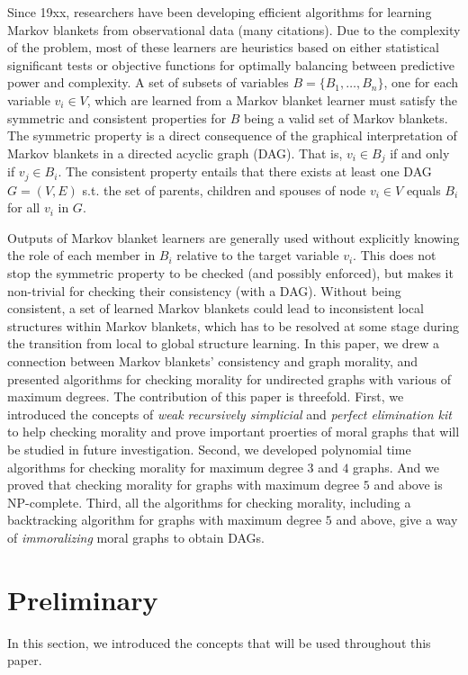 Since 19xx, researchers have been developing efficient algorithms for learning Markov blankets from observational data (many citations). Due to the complexity of the problem, most of these learners are heuristics based on either statistical significant tests or objective functions for optimally balancing between predictive power and complexity. A set of subsets of variables $B=\{B_1, \dots, B_n\}$, one for each variable $v_i \in V$, which are learned from a Markov blanket learner must satisfy the symmetric and consistent properties for $B$ being a valid set of Markov blankets. The symmetric property is a direct consequence of the graphical interpretation of Markov blankets in a directed acyclic graph (DAG). That is, $v_i \in B_j$ if and only if $v_j \in B_i$. The consistent property entails that there exists at least one DAG $G=(V,E)$ s.t. the set of parents, children and spouses of node $v_i \in V$ equals $B_i$ for all $v_i$ in $G$. 

Outputs of Markov blanket learners are generally used without explicitly knowing the role of each member in $B_i$ relative to the target variable $v_i$. This does not stop the symmetric property to be checked (and possibly enforced), but makes it non-trivial for checking their consistency (with a DAG). Without being consistent, a set of learned Markov blankets could lead to inconsistent local structures within Markov blankets, which has to be resolved at some stage during the transition from local to global structure learning. In this paper, we drew a connection between Markov blankets' consistency and graph morality, and presented algorithms for checking morality for undirected graphs with various of maximum degrees. The contribution of this paper is threefold. First, we introduced the concepts of \textit{weak recursively simplicial} and \textit{perfect elimination kit} to help checking morality and prove important proerties of moral graphs that will be studied in future investigation. Second, we developed polynomial time algorithms for checking morality for maximum degree $3$ and $4$ graphs. And we proved that checking morality for graphs with maximum degree $5$ and above is NP-complete. Third, all the algorithms for checking morality, including a backtracking algorithm for graphs with maximum degree $5$ and above, give a way of \textit{immoralizing} moral graphs to obtain DAGs. 


\section{Preliminary}
In this section, we introduced the concepts that will be used throughout this paper. 

